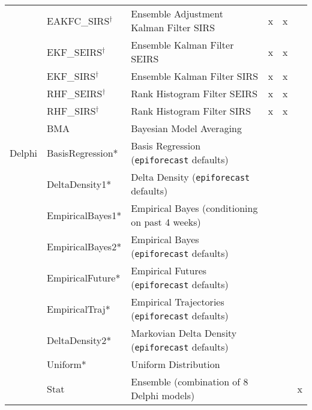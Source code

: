\begin{table*}
\begin{tabular}{p{1.6cm} l p{8.2cm} p{.6cm}  p{.8cm} p{.8cm}}
~        & EAKFC\_SIRS$^\dagger$        & Ensemble Adjustment Kalman Filter SIRS\cite{Pei2017}  & x & x & \\
~        & EKF\_SEIRS$^\dagger$         & Ensemble Kalman Filter SEIRS\cite{Yang2014}    & x             & x &                    \\
~        & EKF\_SIRS$^\dagger$          & Ensemble Kalman Filter SIRS\cite{Yang2014}     & x             & x   &                 \\
~        & RHF\_SEIRS$^\dagger$         & Rank Histogram Filter SEIRS\cite{Yang2014}    & x             & x     &               \\
~        & RHF\_SIRS$^\dagger$          & Rank Histogram Filter SIRS\cite{Yang2014}     & x             & x       &             \\
~        & BMA                & Bayesian Model Averaging\cite{Yamana2017}      & ~             & ~          &          \\
\hline
Delphi   & BasisRegression*    & Basis Regression ({\tt epiforecast} defaults)\cite{Brooks2015a} & ~             & ~     &               \\ 
~        & DeltaDensity1*      & Delta Density ({\tt epiforecast} defaults)\cite{Brooks2018} & ~             & ~       &             \\ 
~        & EmpiricalBayes1*    & Empirical Bayes (conditioning on past 4 weeks)\cite{Brooks2015,Brooks2015a} & ~             & ~  &                  \\ 
~        & EmpiricalBayes2*    & Empirical Bayes ({\tt epiforecast} defaults)\cite{Brooks2015,Brooks2015a} & ~             & ~            &        \\ 
~        & EmpiricalFuture*    & Empirical Futures ({\tt epiforecast} defaults)\cite{Brooks2015a} & ~             & ~         &           \\ 
~        & EmpiricalTraj*      & Empirical Trajectories ({\tt epiforecast} defaults)\cite{Brooks2015a} & ~             & ~         &           \\ 
~        & DeltaDensity2*      & Markovian Delta Density ({\tt epiforecast} defaults)\cite{Brooks2018} & ~             & ~          &          \\ 
~        & Uniform*            & Uniform Distribution& & ~   &                 \\ 
~        & Stat               & Ensemble (combination of 8 Delphi models)\cite{Brooks2018} & ~             & ~  & x                 \\

\end{tabular}
\end{table*}
